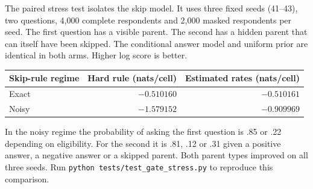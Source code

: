 \documentclass{article}
\begin{document}
The paired stress test isolates the skip model. It uses three fixed seeds
(41--43), two questions, 4,000 complete respondents and 2,000 masked
respondents per seed. The first question has a visible parent. The second
has a hidden parent that can itself have been skipped. The conditional answer
model and uniform prior are identical in both arms. Higher log score is better.
\begin{center}\small
\begin{tabular}{@{}lrr@{}}\toprule
Skip-rule regime & Hard rule (nats/cell) & Estimated rates (nats/cell)\\\midrule
Exact & $-0.510160$ & $-0.510161$\\
Noisy & $-1.579152$ & $-0.909969$\\\bottomrule
\end{tabular}\end{center}
In the noisy regime the probability of asking the first question is .85 or .22
depending on eligibility. For the second it is .81, .12 or .31 given a positive
answer, a negative answer or a skipped parent. Both parent types improved on
all three seeds. Run \texttt{python tests/test\_gate\_stress.py} to reproduce
this comparison.
\end{document}
